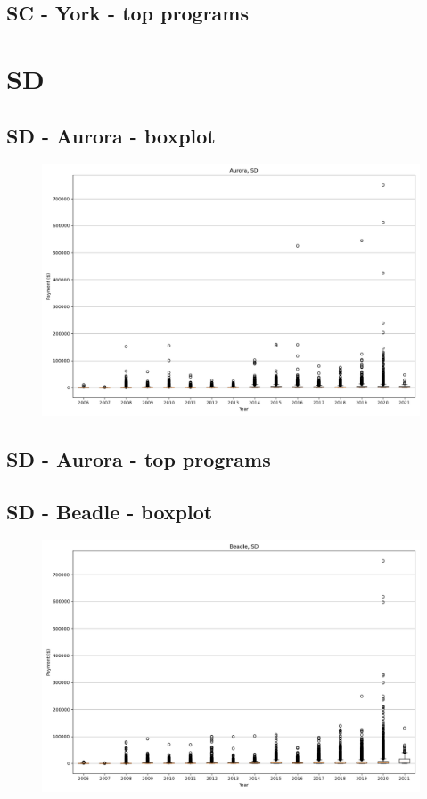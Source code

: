 \subsection*{SC - York - top programs}

\newpage
\section*{SD}
\subsection*{SD - Aurora - boxplot}
\begin{figure}[h]
\centering
\includegraphics[width=7in]{../output/boxplots/counties/Aurora-SD_boxplot.png}
\end{figure}


\subsection*{SD - Aurora - top programs}

\newpage
\subsection*{SD - Beadle - boxplot}
\begin{figure}[h]
\centering
\includegraphics[width=7in]{../output/boxplots/counties/Beadle-SD_boxplot.png}
\end{figure}


